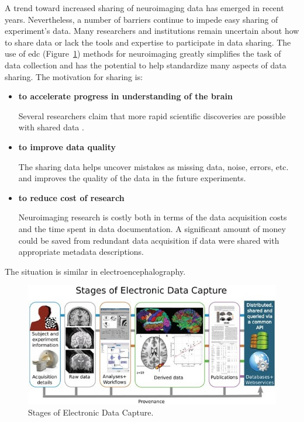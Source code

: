 A trend toward increased sharing of neuroimaging data has emerged in recent years. Nevertheless, a number of barriers continue to impede easy sharing of experiment's data. Many researchers and institutions remain uncertain about how to share data or lack the tools and expertise to participate in data sharing. The use of \gls{edc} (Figure~\ref{stages-edc}) methods for neuroimaging greatly simplifies the task of data collection and has the potential to help standardize many aspects of data sharing. \cite{neuroinf} The motivation for sharing is:
\begin{itemize}
	\item \textbf{to accelerate progress in understanding of the brain}
	
	
	Several researchers claim that more rapid scientific discoveries are possible with shared data \cite{Milham2012} \cite{Poldrack2012}.
	\item \textbf{to improve data quality}
	
	The sharing data helps uncover mistakes as missing data, noise, errors, etc. and improves the quality of the data in the future experiments.
	\item  \textbf{to reduce cost of research} 
	
	Neuroimaging research is costly both in terms of the data acquisition costs and the time spent in data documentation. A significant amount of money could be saved from redundant data acquisition if data were shared with appropriate metadata descriptions. \cite{neuroinf}
\end{itemize} 

The situation is similar in electroencephalography. \cite{neuroinf} \cite{mrieeg}  \cite{incf_mission}


\begin{figure}
	\centering
	\includegraphics[scale=0.6]{obrazky/stages-EDC.jpg}
	\caption {Stages of Electronic Data Capture. \cite{neuroinf}}
	\label{stages-edc}
\end{figure}


